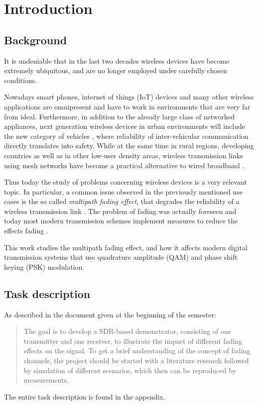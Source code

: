 
\chapter{Introduction} \label{chp:introduction}

\section{Background}

It is undeniable that in the last two decades wireless devices have become extremely ubiquitous, and are no longer employed under carefully chosen conditions.

Nowadays smart phones, internet of things (IoT) devices and many other wireless applications are omnipresent and have to work in environments that are very far from ideal. Furthermore, in addition to the already large class of networked appliances, next generation wireless devices in urban environments will include the new category of vehicles \cite{AntonescuTB17}, where reliability of inter-vehicular communication directly translates into safety. While at the same time in rural regions, developing countries as well as in other low-user density areas, wireless transmission links using mesh networks have become a practical alternative to wired broadband \cite{Macmillan2019tidal,Subramanian2006rethinking,Flickenger2007wireless}.

Thus today the study of problems concerning wireless devices is a very relevant topic. In particular, a common issue observed in the previously mentioned use cases is the so called \emph{multipath fading effect}, that degrades the reliability of a wireless transmission link \cite{Mathis, Gallager}. The problem of fading was actually foreseen \cite{Frederiksen2002overview,Maddocks1993introduction} and today most modern transmission schemes implement measures to reduce the effects fading \cite{Mathis,Hsu}.

This work studies the multipath fading effect, and how it affects modern digital transmission systems that use quadrature amplitude (QAM) and phase shift keying (PSK) modulation.

\section{Task description}

As described in the document given at the beginning of the semester:
\begin{quote}
	The goal is to develop a SDR-based demonstrator, consisting of one transmitter and one receiver, to illustrate the impact of different fading effects on the signal. To get a brief understanding of the concept of fading channels, the project should be started with a literature research followed by simulation of different scenarios, which then can be reproduced by measurements.
\end{quote}
The entire task description is found in the appendix.

